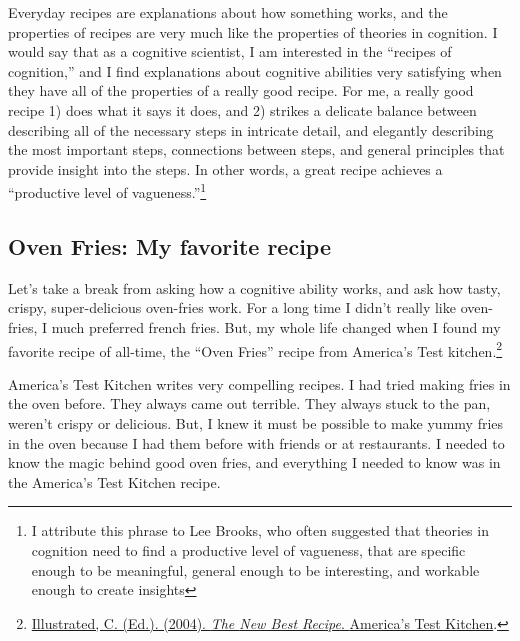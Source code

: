 \documentclass[
  oneside,
  12pt]{crumpbook}
\begin{document}
Everyday recipes are explanations about how something works, and the properties of recipes are very much like the properties of theories in cognition. I would say that as a cognitive scientist, I am interested in the ``recipes of cognition,'' and I find explanations about cognitive abilities very satisfying when they have all of the properties of a really good recipe. For me, a really good recipe 1) does what it says it does, and 2) strikes a delicate balance between describing all of the necessary steps in intricate detail, and elegantly describing the most important steps, connections between steps, and general principles that provide insight into the steps. In other words, a great recipe achieves a ``productive level of vagueness.''\footnote{I attribute this phrase to Lee Brooks, who often suggested that theories in cognition need to find a productive level of vagueness, that are specific enough to be meaningful, general enough to be interesting, and workable enough to create insights}

\hypertarget{oven-fries-my-favorite-recipe}{%
\subsection{Oven Fries: My favorite recipe}\label{oven-fries-my-favorite-recipe}}

Let's take a break from asking how a cognitive ability works, and ask how tasty, crispy, super-delicious oven-fries work. For a long time I didn't really like oven-fries, I much preferred french fries. But, my whole life changed when I found my favorite recipe of all-time, the ``Oven Fries'' recipe from America's Test kitchen.\footnote{\protect\hyperlink{ref-illustratedNewBestRecipe2004}{Illustrated, C. (Ed.). (2004). \emph{The {New Best Recipe}}. {America's Test Kitchen}}.}

America's Test Kitchen writes very compelling recipes. I had tried making fries in the oven before. They always came out terrible. They always stuck to the pan, weren't crispy or delicious. But, I knew it must be possible to make yummy fries in the oven because I had them before with friends or at restaurants. I needed to know the magic behind good oven fries, and everything I needed to know was in the America's Test Kitchen recipe.
\end{document}
